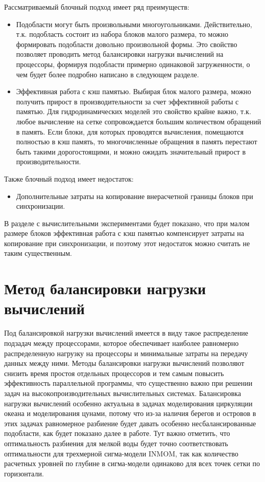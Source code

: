 Рассматриваемый блочный подход имеет ряд преимуществ:
\begin{itemize}
    \item Подобласти могут быть произвольными многоугольниками. Действительно, т.к. подобласть состоит из набора блоков малого размера, то можно формировать подобласти довольно произвольной формы. Это свойство позволяет проводить метод балансировки нагрузки вычислений на процессоры, формируя подобласти примерно одинаковой загруженности, о чем будет более подробно написано в следующем разделе.
    \item Эффективная работа с кэш памятью. Выбирая блок малого размера, можно получить прирост в производительности за счет эффективной работы с памятью.
    Для гидродинамических моделей это свойство крайне важно, т.к. любое вычисление на сетке сопровождается большим количеством обращений в память.
    Если блоки, для которых проводятся вычисления, помещаются полностью в кэш память, то  многочисленные обращения в память перестают быть такими дорогостоящими,
    и можно ожидать значительный прирост в производительности.
\end{itemize}

Также блочный подход имеет недостаток:
\begin{itemize}
    \item Дополнительные затраты на копирование внерасчетной границы блоков при синхронизации.
\end{itemize}

В разделе с вычислительными экспериментами будет показано, что при малом размере блоков эффективная работа с кэш памятью компенсирует затраты на копирование при синхронизации, и поэтому этот недостаток можно считать не таким существенным.

\section{Метод балансировки нагрузки вычислений}\label{sec:ch2/sec3}

Под балансировкой нагрузки вычислений имеется в виду такое распределение подзадач между процессорами, 
которое обеспечивает наиболее равномерно распределенную нагрузку на процессоры и минимальные затраты на передачу данных между ними.
Методы балансировки нагрузки вычислений позволяют снизить время простоя отдельных процессоров
и тем самым повысить эффективность параллельной программы, что существенно важно при решении задач 
на высокопроизводительных вычислительных системах.
Балансировка нагрузки вычислений особенно актуальна в задачах моделирования циркуляции океана и моделирования цунами,
потому что из-за наличия берегов и островов в этих задачах равномерное разбиение будет давать особенно несбалансированные подобласти, как будет показано далее в работе.
Тут важно отметить, что оптимальность разбиения для мелкой воды будет точно соответствовать оптимальности для трехмерной сигма-модели INMOM, 
так как количество расчетных уровней по глубине в сигма-модели одинаково для всех точек сетки по горизонтали. 

